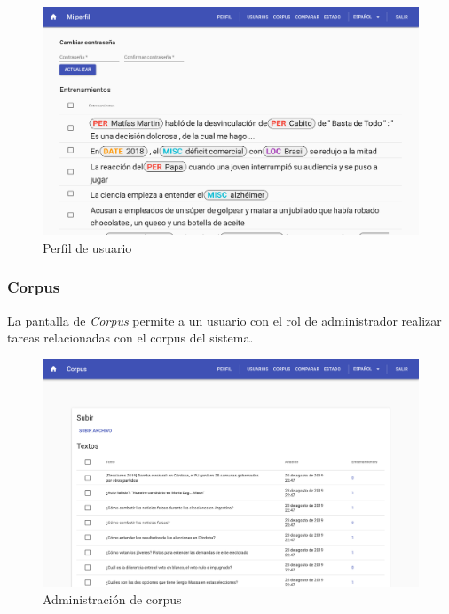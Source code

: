 \documentclass[12pt,a4paper,]{scrartcl}
\begin{document}
\begin{figure}[H]

{\centering \includegraphics{assets/logic/user-profile.pdf} 

}

\caption{Perfil de usuario}\label{fig:logic-user-profile}
\end{figure}

\hypertarget{corpus}{%
\subsubsection{Corpus}\label{corpus}}

La pantalla de \emph{Corpus} permite a un usuario con el rol de administrador realizar tareas relacionadas con el corpus del sistema.

\begin{figure}[H]

{\centering \includegraphics{assets/logic/corpus-management.pdf} 

}

\caption{Administración de corpus}\label{fig:logic-corpus-management}
\end{figure}
\end{document}
